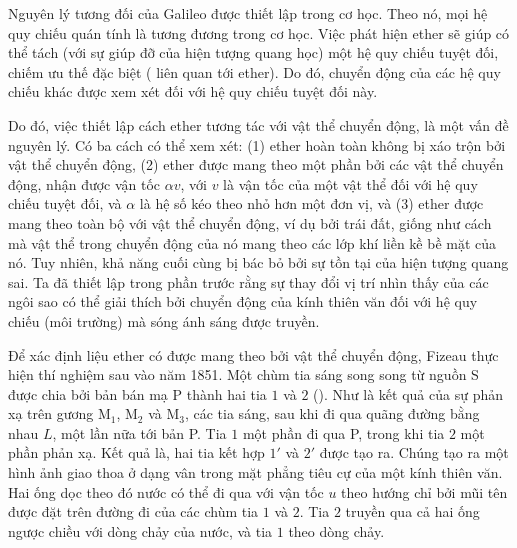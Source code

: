 Nguyên lý tương đối của Galileo được thiết lập trong cơ học.
Theo nó, mọi hệ quy chiếu quán tính là tương đương trong cơ học.
Việc phát hiện ether sẽ giúp có thể tách (với sự giúp đỡ của hiện tượng quang học) một hệ quy chiếu tuyệt đối, chiếm ưu thế đặc biệt ( liên quan tới ether).
Do đó, chuyển động của các hệ quy chiếu khác được xem xét đối với hệ quy chiếu tuyệt đối này.

Do đó, việc thiết lập cách ether tương tác với vật thể chuyển động, là một vấn đề nguyên lý.
Có ba cách có thể xem xét: (1) ether hoàn toàn không bị xáo trộn bởi vật thể chuyển động, (2) ether được mang theo một phần bởi các vật thể chuyển động, nhận được vận tốc $\alpha v$, với $v$ là vận tốc của một vật thể đối với hệ quy chiếu tuyệt đối, và $\alpha$ là hệ số kéo theo nhỏ hơn một đơn vị, và (3) ether được mang theo toàn bộ với vật thể chuyển động, ví dụ bởi trái đất, giống như cách mà vật thể trong chuyển động của nó mang theo các lớp khí liền kề bề mặt của nó.
Tuy nhiên, khả năng cuối cùng bị bác bỏ bởi sự tồn tại của hiện tượng quang sai.
Ta đã thiết lập trong phần trước rằng sự thay đổi vị trí nhìn thấy của các ngôi sao có thể giải thích bởi chuyển động của kính thiên văn đối với hệ quy chiếu (môi trường) mà sóng ánh sáng được truyền.

Để xác định liệu ether có được mang theo bởi vật thể chuyển động, Fizeau thực hiện thí nghiệm sau vào năm 1851.
Một chùm tia sáng song song từ nguồn S được chia bởi bản bán mạ P thành hai tia $1$ và $2$ ().
Như là kết quả của sự phản xạ trên gương M$_1$, M$_2$ và M$_3$, các tia sáng, sau khi đi qua quãng đường bằng nhau $L$, một lần nữa tới bản P.
Tia $1$ một phần đi qua P, trong khi tia $2$ một phần phản xạ.
Kết quả là, hai tia kết hợp $1'$ và $2'$ được tạo ra.
Chúng tạo ra một hình ảnh giao thoa ở dạng vân trong mặt phẳng tiêu cự của một kính thiên văn.
Hai ống dọc theo đó nước có thể đi qua với vận tốc $u$ theo hướng chỉ bởi mũi tên được đặt trên đường đi của các chùm tia $1$ và $2$.
Tia $2$ truyền qua cả hai ống ngược chiều với dòng chảy của nước, và tia $1$ theo dòng chảy.

